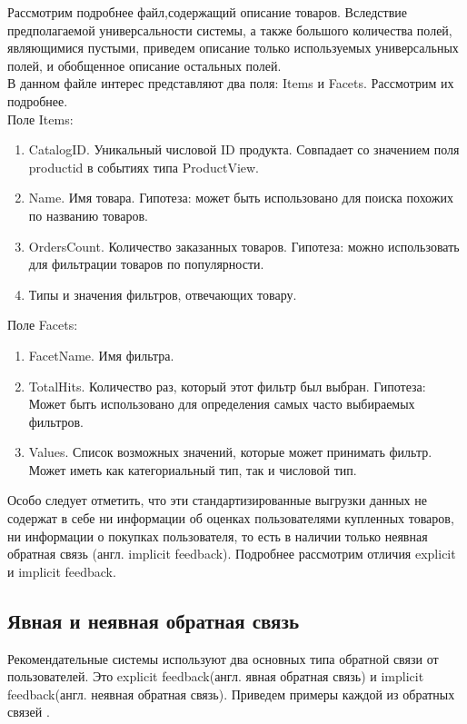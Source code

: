 \documentclass[14pt]{mmcs_article}
\newenvironment{myenumerate}
{ \begin{enumerate}
		\setlength{\itemsep}{0pt}
		\setlength{\parskip}{0pt}
		\setlength{\parsep}{0pt}     }
	{ \end{enumerate}                  }
\begin{document}
Рассмотрим подробнее файл,содержащий описание товаров. Вследствие предполагаемой универсальности системы, а также большого количества полей, являющимися пустыми, приведем описание только используемых универсальных полей, и обобщенное описание остальных полей.\\
В данном файле интерес представляют два поля: Items и Facets. Рассмотрим их подробнее. \\
Поле Items:
\begin{myenumerate}
	
	\item CatalogID. Уникальный числовой ID продукта. Совпадает со значением поля productid в событиях типа ProductView.
	\item Name. Имя товара. Гипотеза: может быть использовано для поиска похожих по названию товаров.
 	\item OrdersCount. Количество заказанных товаров. Гипотеза: можно использовать для фильтрации товаров по популярности.
	\item Типы и значения фильтров, отвечающих товару.
\end{myenumerate}
Поле Facets:
\begin{myenumerate}
	
	\item FacetName. Имя фильтра.
	\item TotalHits. Количество раз, который этот фильтр был выбран. Гипотеза: Может быть использовано для определения самых часто выбираемых фильтров.
	\item Values. Список возможных значений, которые может принимать фильтр. Может иметь как категориальный тип, так и числовой тип. 
\end{myenumerate}

Особо следует отметить, что эти стандартизированные выгрузки данных не содержат в себе ни информации об оценках пользователями купленных товаров, ни информации о покупках пользователя, то есть в наличии только неявная обратная связь (англ. implicit feedback). Подробнее рассмотрим отличия explicit и implicit feedback.

\subsection{Явная и неявная обратная связь}
Рекомендательные системы используют два основных типа обратной связи от пользователей. Это explicit feedback(англ. явная обратная связь) и implicit feedback(англ. неявная обратная связь). Приведем примеры каждой из обратных связей \cite{stud:kimfalk1}.
\end{document}
